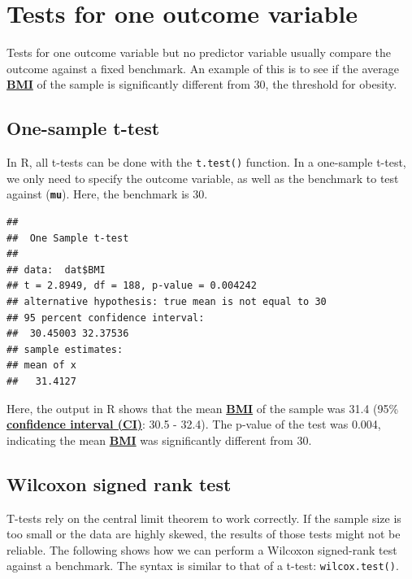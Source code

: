 \documentclass[
]{book}
\newenvironment{Shaded}{\begin{snugshade}}{\end{snugshade}}
\newcommand{\AttributeTok}[1]{\textcolor[rgb]{0.13,0.29,0.53}{#1}}
\newcommand{\DecValTok}[1]{\textcolor[rgb]{0.00,0.00,0.81}{#1}}
\newcommand{\FunctionTok}[1]{\textcolor[rgb]{0.13,0.29,0.53}{\textbf{#1}}}
\newcommand{\NormalTok}[1]{#1}
\newcommand{\SpecialCharTok}[1]{\textcolor[rgb]{0.81,0.36,0.00}{\textbf{#1}}}
\begin{document}
\section{Tests for one outcome variable}\label{tests-for-one-outcome-variable}

Tests for one outcome variable but no predictor variable usually compare the outcome against a fixed benchmark. An example of this is to see if the average \textbf{\hyperref[acronyms_BMI]{BMI}} of the sample is significantly different from 30, the threshold for obesity.

\subsection{One-sample t-test}\label{one-sample-t-test}

In R, all t-tests can be done with the \texttt{t.test()} function. In a one-sample t-test, we only need to specify the outcome variable, as well as the benchmark to test against (\textbf{\texttt{mu}}). Here, the benchmark is 30.

\begin{Shaded}
\end{Shaded}

\begin{verbatim}
## 
##  One Sample t-test
## 
## data:  dat$BMI
## t = 2.8949, df = 188, p-value = 0.004242
## alternative hypothesis: true mean is not equal to 30
## 95 percent confidence interval:
##  30.45003 32.37536
## sample estimates:
## mean of x 
##   31.4127
\end{verbatim}

Here, the output in R shows that the mean \textbf{\hyperref[acronyms_BMI]{BMI}} of the sample was 31.4 (95\% \textbf{\hyperref[acronyms_CI]{confidence interval (CI)}}: 30.5 - 32.4). The p-value of the test was 0.004, indicating the mean \textbf{\hyperref[acronyms_BMI]{BMI}} was significantly different from 30.

\subsection{Wilcoxon signed rank test}\label{sec:WilcoxonSignedRankTest}

T-tests rely on the central limit theorem to work correctly. If the sample size is too small or the data are highly skewed, the results of those tests might not be reliable. The following shows how we can perform a Wilcoxon signed-rank test against a benchmark. The syntax is similar to that of a t-test: \texttt{wilcox.test()}.
\end{document}
